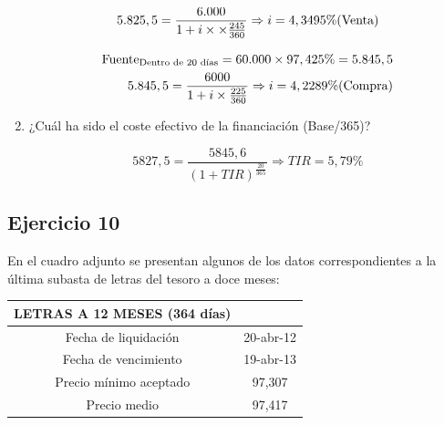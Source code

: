 \begin{enumerate}[label=\textbf{\alph*)}]
    \begin{align*}
        5\text{.}825,5 = \frac{6\text{.}000}{1+i\times\times\frac{245}{360}} \Rightarrow i = 4,3495\% \text{(Venta)}\\
    \end{align*}

    \begin{align*}
        \text{Fuente}_{\text{Dentro de 20 días}} = 60\text{.}000 \times 97,425\% = 5\text{.}845,5 \\
        5\text{.}845,5 = \frac{6000}{1+i\times \frac{225}{360}} \Rightarrow i = 4,2289\% \text{(Compra)}
    \end{align*}

    \item ¿Cuál ha sido el coste efectivo de la financiación (Base/365)?
    
    \begin{equation*}
        5827,5 = \frac{5845,6}{(1+TIR)^{\frac{20}{365}}} \Rightarrow TIR = 5,79\%
    \end{equation*}

\end{enumerate}


\subsection*{Ejercicio 10}
En el cuadro adjunto se presentan algunos de los datos correspondientes a la última subasta de letras del tesoro a doce meses:
   
    
    \begin{table}[h!]
        \centering
        \begin{tabular}{|c|c|}
            \hline
            \textbf{LETRAS A 12 MESES (364 días)} & \textbf{} \\
            \hline
            Fecha de liquidación & 20-abr-12 \\
            \hline
            Fecha de vencimiento & 19-abr-13 \\
            \hline
            Precio mínimo aceptado & 97,307 \\
            \hline
            Precio medio & 97,417 \\
            \hline
        \end{tabular}
    \end{table}

